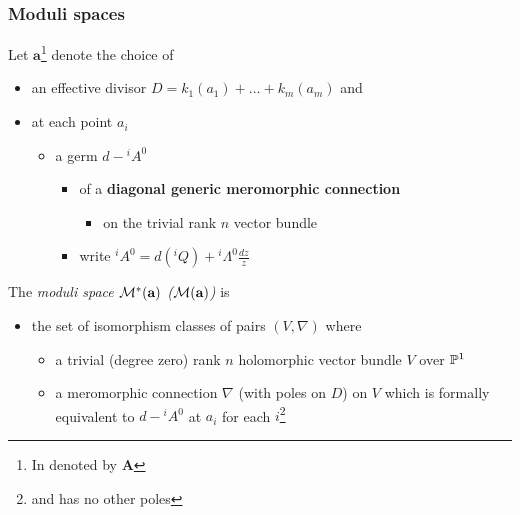 \subsubsection{Moduli spaces} %
Let $\textbf{a}$\footnote{In \cite{thboalch} denoted by $\textbf{A}$} denote
the choice of
\begin{itemize}
  \item an effective divisor $D=k_1(a_1)+\dots+k_m(a_m)$ and
  \item at each point $a_i$
    \begin{itemize}
      \item a germ $d-{}^iA^0$
        \begin{itemize}
          \item of a \textbf{diagonal generic meromorphic connection}
            \begin{itemize}
              \item on the trivial rank $n$ vector bundle
            \end{itemize}
          \item write ${}^iA^0=d({}^iQ)+{}^i\Lambda^0\frac{dz}{z}$
        \end{itemize}
    \end{itemize}
\end{itemize}
\begin{defn}[2.5]
  The \emph{moduli space $\cM^*(\textbf{a})$
  \textcolor{green!40!black}{($\cM(\textbf{a})$)}} is
  \begin{itemize}
    \item the set of isomorphism classes of pairs $(V,\nabla)$ where
      \begin{itemize}
        \item a trivial \textcolor{green!40!black}{(degree zero)} rank $n$
          holomorphic vector bundle $V$ over $\P^1$
        \item a meromorphic connection $\nabla$ (with poles on $D$) on $V$
          which is formally equivalent to $d-{}^iA^0$ at $a_i$ for each
          $i$\footnote{and has no other poles}
      \end{itemize}
  \end{itemize}
\end{defn}
